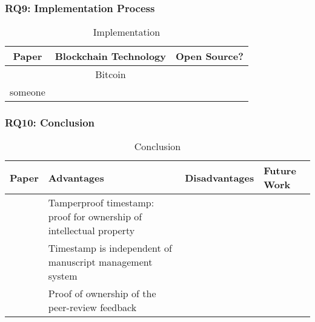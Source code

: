 \clearpage
\subsubsection{RQ9: Implementation Process}

\begin{longtable}{ |c|c|c| }
	\caption{Implementation}
	\label{tab:rq9_implementation_process}\\
	\hline
 	\textbf{Paper} & Blockchain Technology & \textbf{Open Source?} \\ [0.5ex] 
 	\hline\hline
 	\endhead
 	\cite{2017_Gipp} & Bitcoin & \cmark \\
	\hline
	someone & \xmark \\
	\hline
\end{longtable}

\clearpage
\subsubsection{RQ10: Conclusion}

\begin{longtable}{ |c|p{4cm}|p{4cm}|p{4cm}| }
	\caption{Conclusion}
	\label{tab:rq10_conclusion}\\
	\hline
 	\textbf{Paper} & \textbf{Advantages} & \textbf{Disadvantages} & \textbf{Future Work}\\ [0.5ex] 
 	\hline\hline
 	\endhead
 	\multirow{3}{*}{\cite{2017_Gipp}} & Tamperproof timestamp: proof for ownership of intellectual property & \multirow{3}{*}{\xmark } & \\
	\cline{2-2}
	 & Timestamp is independent of manuscript management system & & \\
	\cline{2-2}
	 & Proof of ownership of the peer-review feedback & & \\
	\hline
\end{longtable}
